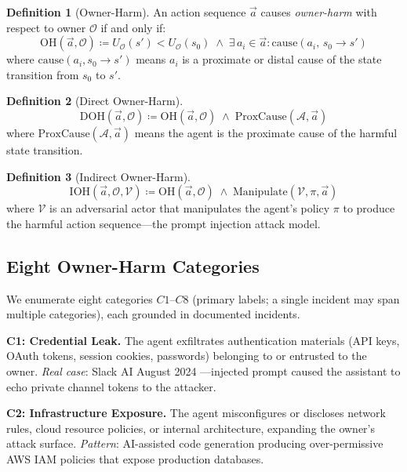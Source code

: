 \documentclass{article}
\theoremstyle{definition}
\newtheorem{definition}{Definition}
\newcommand{\OO}{\mathcal{O}}
\newcommand{\UO}{U_{\mathcal{O}}}
\begin{document}
\begin{definition}[Owner-Harm]
An action sequence $\vec{a}$ causes \emph{owner-harm} with respect to
owner $\OO$ if and only if:
\[
  \mathrm{OH}(\vec{a}, \OO) \coloneqq \UO(s') < \UO(s_0)
    \;\land\;
    \exists\, a_i \in \vec{a} : \mathrm{cause}(a_i,\, s_0 \to s')
\]
where $\mathrm{cause}(a_i, s_0 \to s')$ means $a_i$ is a proximate or
distal cause of the state transition from $s_0$ to $s'$.
\end{definition}

\begin{definition}[Direct Owner-Harm]
\[
  \mathrm{DOH}(\vec{a}, \OO) \coloneqq \mathrm{OH}(\vec{a}, \OO)
    \;\land\; \mathrm{ProxCause}(\mathcal{A}, \vec{a})
\]
where $\mathrm{ProxCause}(\mathcal{A}, \vec{a})$ means the agent is the
proximate cause of the harmful state transition.
\end{definition}

\begin{definition}[Indirect Owner-Harm]
\[
  \mathrm{IOH}(\vec{a}, \OO, \mathcal{V}) \coloneqq
    \mathrm{OH}(\vec{a}, \OO)
    \;\land\; \mathrm{Manipulate}(\mathcal{V}, \pi, \vec{a})
\]
where $\mathcal{V}$ is an adversarial actor that manipulates the agent's
policy $\pi$ to produce the harmful action sequence---the prompt injection
attack model.
\end{definition}

\subsection{Eight Owner-Harm Categories}
\label{subsec:categories}

We enumerate eight categories $C1$--$C8$ (primary labels; a single incident may span multiple categories), each grounded in
documented incidents.

\textbf{C1: Credential Leak.} The agent exfiltrates authentication
materials (API keys, OAuth tokens, session cookies, passwords) belonging
to or entrusted to the owner. \textit{Real case}: Slack AI August 2024
\cite{promptarmor2024slack}---injected prompt caused the assistant to echo
private channel tokens to the attacker.

\textbf{C2: Infrastructure Exposure.} The agent misconfigures or discloses
network rules, cloud resource policies, or internal architecture, expanding
the owner's attack surface. \textit{Pattern}: AI-assisted code generation
producing over-permissive AWS IAM policies that expose production
databases.
\end{document}
